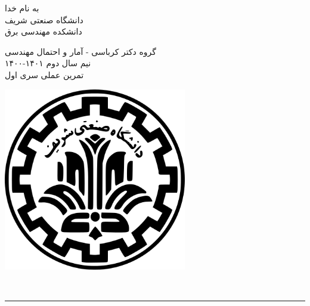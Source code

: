\documentclass[a4paper]{article}
\begin{document}
\begin{minipage}{0.6\textwidth}
\begin{bf}
\begin{center}
	به نام خدا\\
	\vspace{0.25cm}
	دانشگاه صنعتی شریف\\
	\vspace{0.25cm}
	دانشکده مهندسی برق\\
	\vspace{0.5cm}

\large
گروه دکتر کرباسی - آمار و احتمال مهندسی \\
نیم سال دوم
۱۴۰۱-۱۴۰۰\\
\Large
\vspace{0.4cm}
تمرین عملی سری اول \\
\end{center}
\end{bf}
\normalsize
\end{minipage} \hfill
\begin{minipage}{0.35\textwidth}
\begin{flushleft}
\includegraphics[width=0.6\textwidth]{Shariflogo.png}\\ \large
\end{flushleft}

 \end{minipage}
\\

\rule[0.1\baselineskip]{\textwidth}{1.5pt}

\large
\end{document}
